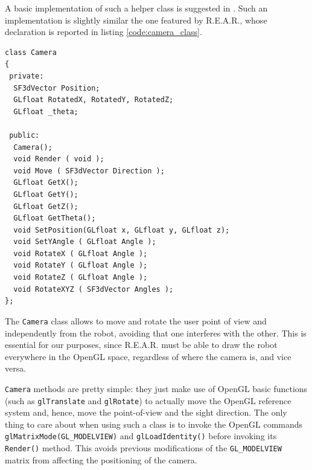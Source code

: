 %
A basic implementation of such a helper class is suggested 
in \cite{opengl:camera}. Such an implementation is slightly 
similar the one featured by \textsf{R.E.A.R.}, whose 
declaration is reported in listing \ref{code:camera_class}.
%
\begin{lstlisting}[caption={\texttt{Camera} class declaration}, label={code:camera_class}, frame=trBL]
class Camera
{
 private:
  SF3dVector Position;
  GLfloat RotatedX, RotatedY, RotatedZ;	
  GLfloat _theta;

 public:
  Camera();
  void Render ( void );
  void Move ( SF3dVector Direction );
  GLfloat GetX();
  GLfloat GetY();
  GLfloat GetZ();
  GLfloat GetTheta();
  void SetPosition(GLfloat x, GLfloat y, GLfloat z);
  void SetYAngle ( GLfloat Angle );
  void RotateX ( GLfloat Angle );
  void RotateY ( GLfloat Angle );
  void RotateZ ( GLfloat Angle );
  void RotateXYZ ( SF3dVector Angles );
};
\end{lstlisting}
%
The \texttt{Camera} class allows to move and rotate the user 
point of view and independently from the robot, avoiding 
that one interferes with the other. 
%
This is essential for our purposes, since \textsf{R.E.A.R.}
must be able to draw the robot everywhere in the OpenGL space, 
regardless of where the camera is, and vice versa.
%

%
\texttt{Camera} methods are pretty simple: they just make 
use of OpenGL basic functions (such as \texttt{glTranslate} 
and \texttt{glRotate}) to actually move the OpenGL reference 
system and, hence, move the point-of-view and the sight 
direction.
%
The only thing to care about when using such a class is 
to invoke the OpenGL commands \texttt{glMatrixMode(GL\_MODELVIEW)} 
and \texttt{glLoadIdentity()} before invoking its 
\texttt{Render()} method. This avoids previous modifications 
of the \texttt{GL\_MODELVIEW} matrix from affecting the 
positioning of the camera.
%

%
